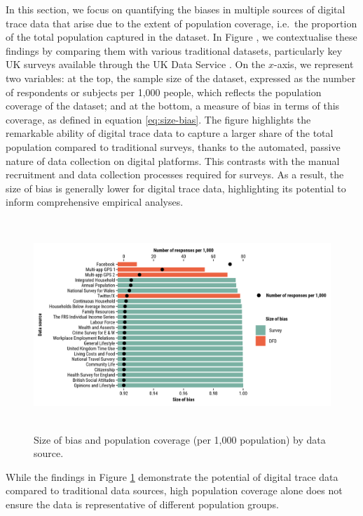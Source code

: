 \documentclass[]{rsos}%
\begin{document}
In this section, we focus on quantifying the biases in multiple sources
of digital trace data that arise due to the extent of population
coverage, i.e.~the proportion of the total population captured in the
dataset. In Figure , we contextualise these findings by comparing them
with various traditional datasets, particularly key UK surveys available
through the UK Data Service \citep{ukdataserviceSurveysData}. On the
\(x\)-axis, we represent two variables: at the top, the sample size of the
dataset, expressed as the number of respondents or subjects per 1,000
people, which reflects the population coverage of the dataset; and at
the bottom, a measure of bias in terms of this coverage, as defined in
equation \ref{eq:size-bias}. The figure highlights the remarkable
ability of digital trace data to capture a larger share of the total
population compared to traditional surveys, thanks to the automated,
passive nature of data collection on digital platforms. This contrasts
with the manual recruitment and data collection processes required for
surveys. As a result, the size of bias is generally lower for digital
trace data, highlighting its potential to inform comprehensive empirical
analyses.

\begin{figure}
\centering
\includegraphics[width=5.20833in,height=3.125in]{figures/compare-surveys-legend.png}
\caption{Size of bias and population coverage (per 1,000 population) by data
source.}\label{fig:survey}
\end{figure}

While the findings in Figure \ref{fig:survey} demonstrate the potential
of digital trace data compared to traditional data sources, high
population coverage alone does not ensure the data is representative of
different population groups.
\end{document}
